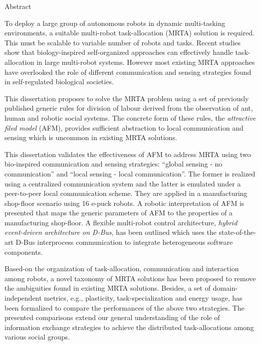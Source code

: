 \begin{Large}
Abstract\\
\end{Large}
\newline
To deploy a large group of autonomous robots in dynamic multi-tasking environments, a suitable multi-robot task-allocation (MRTA) solution is required. This must be scalable to variable number of robots and tasks. Recent studies show that biology-inspired self-organized approaches can effectively handle task-allocation in large multi-robot systems. However most existing MRTA approaches have overlooked the role of different communication and sensing strategies found in self-regulated biological societies.

This dissertation proposes to solve the MRTA problem using a set of previously published generic rules for division of labour derived from the observation of ant, human and robotic social systems. The concrete form of these rules, the \textit{attractive filed model} (AFM), provides sufficient abstraction to local communication and sensing which is uncommon in existing MRTA solutions. 

This dissertation validates the effectiveness of AFM to address MRTA  using two bio-inspired communication and sensing strategies: ``global sensing - no communication'' and ``local sensing - local communication''. The former is realized using a centralized communication system and the latter is emulated under a peer-to-peer local communication scheme. They are applied in a  manufacturing shop-floor scenario using 16 e-puck robots. A robotic interpretation of AFM is presented that maps the generic parameters of AFM to the properties of a manufacturing shop-floor. A flexible multi-robot control architecture, \textit{hybrid event-driven architecture on D-Bus}, has been outlined which uses the state-of-the-art D-Bus interprocess communication  to integrate heterogeneous software components. 

Based-on the organization of task-allocation, communication and interaction among robots, a  novel taxonomy of MRTA solutions has been proposed to remove the ambiguities found in existing MRTA solutions. Besides, a set of domain-independent metrics, e.g., plasticity, task-specialization and energy usage, has been formalized to compare the performances of the above two strategies. The presented comparisons extend our general understanding of the role of information exchange strategies to achieve the distributed task-allocations among various social groups.